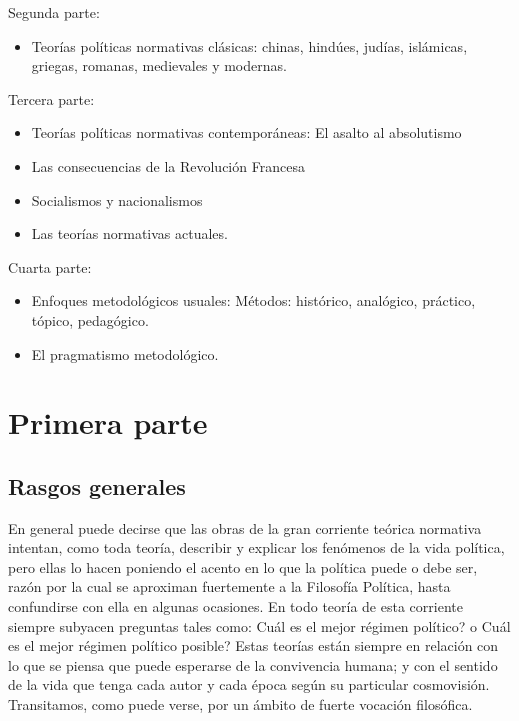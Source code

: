 \documentclass[
]{book}
\providecommand{\tightlist}{%
  \setlength{\itemsep}{0pt}\setlength{\parskip}{0pt}}
\begin{document}
Segunda parte:

\begin{itemize}
\tightlist
\item
  Teorías políticas normativas clásicas: chinas, hindúes, judías, islámicas, griegas, romanas, medievales y modernas.
\end{itemize}

Tercera parte:

\begin{itemize}
\tightlist
\item
  Teorías políticas normativas contemporáneas: El asalto al absolutismo
\item
  Las consecuencias de la Revolución Francesa
\item
  Socialismos y nacionalismos
\item
  Las teorías normativas actuales.
\end{itemize}

Cuarta parte:

\begin{itemize}
\tightlist
\item
  Enfoques metodológicos usuales: Métodos: histórico, analógico, práctico, tópico, pedagógico.
\item
  El pragmatismo metodológico.
\end{itemize}

\hypertarget{primera-parte-1}{%
\section*{Primera parte}\label{primera-parte-1}}

\hypertarget{rasgos-generales}{%
\subsection*{Rasgos generales}\label{rasgos-generales}}

En general puede decirse que las obras de la gran corriente teórica normativa intentan, como toda teoría, describir y explicar los fenómenos de la vida política, pero ellas lo hacen poniendo el acento en lo que la política puede o debe ser, razón por la cual se aproximan fuertemente a la Filosofía Política, hasta confundirse con ella en algunas ocasiones. En todo teoría de esta corriente siempre subyacen preguntas tales como: Cuál es el mejor régimen político? o Cuál es el mejor régimen político posible? Estas teorías están siempre en relación con lo que se piensa que puede esperarse de la convivencia humana; y con el sentido de la vida que tenga cada autor y cada época según su particular cosmovisión. Transitamos, como puede verse, por un ámbito de fuerte vocación filosófica.
\end{document}
